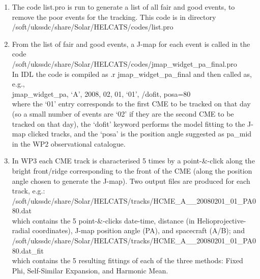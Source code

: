 \documentclass[12pt, a4paper, oneside]{article}
\begin{document}
\begin{enumerate}

\item The code list.pro is run to generate a list of all fair and good events, to remove the poor events for the tracking. This code is in directory\\
/soft/ukssdc/share/Solar/HELCATS/codes/list.pro\\

\item From the list of fair and good events, a J-map for each event is called in the code\\
/soft/ukssdc/share/Solar/HELCATS/codes/jmap\_widget\_pa\_final.pro\\
In IDL the code is compiled as .r jmap\_widget\_pa\_final and then called as, e.g.,\\
jmap\_widget\_pa, `A', 2008, 02, 01, `01', /dofit, posa=80 \\
where the `01' entry corresponds to the first CME to be tracked on that day (so a small number of events are `02' if they are the second CME to be tracked on that day), the `dofit' keyword performs the model fitting to the J-map clicked tracks, and the `posa' is the position angle suggested as pa\_mid in the WP2 observational catalogue.

\item In WP3 each CME track is characterised 5 times by a point-\&-click along the bright front/ridge corresponding to the front of the CME (along the position angle chosen to generate the J-map). Two output files are produced for each track, e.g.: \\
/soft/ukssdc/share/Solar/HELCATS/tracks/HCME\_A\_\_20080201\_01\_PA080.dat \\
which contains the 5 point-\&-clicks date-time, distance (in Helioprojective-radial coordinates), J-map position angle (PA), and spacecraft (A/B); and\\
/soft/ukssdc/share/Solar/HELCATS/tracks/HCME\_A\_\_20080201\_01\_PA080.dat\_fit \\
which contains the 5 resulting fittings of each of the three methods: Fixed Phi, Self-Similar Expansion, and Harmonic Mean.

\end{enumerate}
\end{document}

